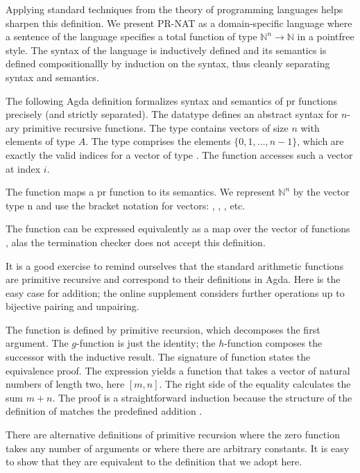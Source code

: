 \documentclass[a4paper,USenglish,cleveref, autoref, thm-restate]{lipics-v2021}
\begin{document}
Applying standard techniques from the
theory of programming languages helps sharpen this definition.
We present PR-NAT as a domain-specific language where a
sentence of the language specifies a total function of type ${ℕ}^n \to {ℕ}$
in a pointfree style. The syntax of the language is inductively
defined and its semantics is defined compositionallly by induction on the
syntax, thus cleanly separating syntax and semantics.

The following Agda definition formalizes syntax and semantics of pr
functions precisely (and strictly separated).
The datatype  defines an abstract syntax for $n$-ary primitive recursive functions.
The type  contains vectors of size $n$ with elements of type $A$.
The type  comprises the elements $\{0, 1, \dots, n-1\}$, which
are exactly the valid indices for a vector of type . 
The function  accesses such a vector at index $i$.

\PRNat

The function  maps a pr function to its semantics.
We represent ${ℕ}^n$ by the vector type n and use the bracket notation for vectors: \Anil, , , etc.

\PRNatEval

The function  can be expressed equivalently as a
map over the vector of functions , alas the termination
checker does not accept this definition.  


It is a good exercise to remind ourselves that the standard arithmetic
functions are primitive recursive and correspond to their definitions in
Agda. Here is the easy case for addition; the online supplement
considers further operations up to bijective pairing and unpairing. 

\PRNatExampleAdd
The function  is defined by primitive recursion, which
decomposes the first argument. The $g$-function is just the identity;
the $h$-function composes the successor with the inductive result.
The signature of function  states
the equivalence proof. The expression  yields
a function that takes a vector of natural numbers of length two, here
$[m, n]$. The right side of the equality calculates the sum $m+n$.
The proof is a straightforward induction because the structure of the definition of
 matches the predefined addition \AgdaFunction{$+$}.

There are alternative definitions of primitive recursion where the
zero function takes any number of arguments or where there are
arbitrary constants. It is easy to show that they are equivalent to
the definition that we adopt here.
\end{document}
